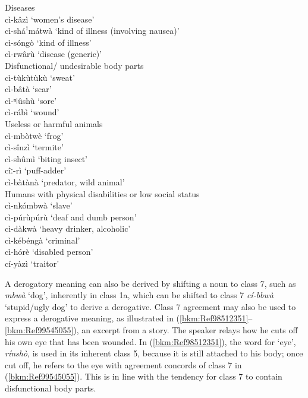 \ea Diseases \\
cì-kâzì \tab ‘women’s disease’\\
cì-sháꜝmátwà \tab ‘kind of illness (involving nausea)’\\
cì-sóngò \tab ‘kind of illness’\\
cì-rwârù \tab ‘disease (generic)’\\
\ex Disfunctional/ undesirable body parts \\ cì-tùkùtùkù \tab ‘sweat’\\
cì-bâtà \tab ‘scar’\\
cì-ⁿǀûshù \tab ‘sore’\\
cì-rábì \tab ‘wound’\\
\ex Useless or harmful animals \\
cì-mbòtwè \tab ‘frog’\\
cì-sînzì \tab ‘termite’\\
cì-shûmì \tab ‘biting insect’\\
cîː-rì \tab ‘puff-adder’\\
cì-bàtànà \tab ‘predator, wild animal’\\
\ex Humans with physical disabilities or low social status \\
cì-nkómbwà \tab ‘slave’\\
cì-púrùpúrù \tab ‘deaf and dumb person’\\
cì-dàkwà \tab ‘heavy drinker, alcoholic’\\
cì-kébéngà \tab ‘criminal’\\
cì-hórè \tab ‘disabled person’\\
cí-yàzì \tab‘traitor’\\
\z\z

A derogatory meaning can also be derived by shifting a noun to class 7, such as \textit{mbwà} ‘dog’, inherently in class 1a, which can be shifted to class 7 \textit{cí-bbwà} ‘stupid/ugly dog’ to derive a derogative. Class 7 agreement may also be used to express a derogative meaning, as illustrated in (\ref{bkm:Ref98512351}--\ref{bkm:Ref99545055}), an excerpt from a story. The speaker relays how he cuts off his own eye that has been wounded. In (\ref{bkm:Ref98512351}), the word for ‘eye’, \textit{rínshò}, is used in its inherent class 5, because it is still attached to his body; once cut off, he refers to the eye with agreement concords of class 7 in (\ref{bkm:Ref99545055}). This is in line with the tendency for class 7 to contain disfunctional body parts.

